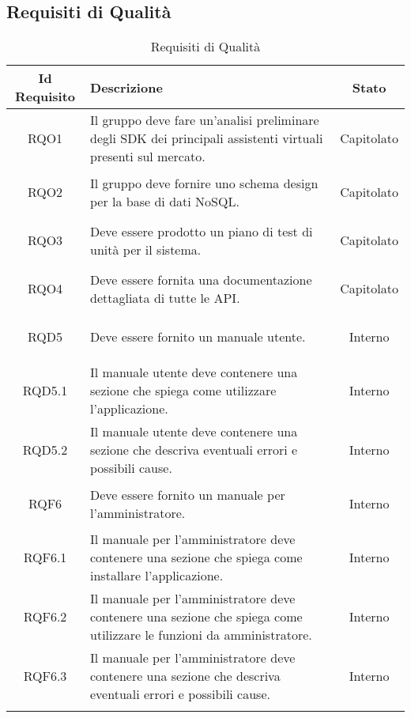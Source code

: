 \subsection{Requisiti di Qualità}
\normalsize
\begin{longtable}{|c|>{\centering}m{7cm}|c|}
\hline
\textbf{Id Requisito} & \textbf{Descrizione} & \textbf{Stato}\\
\hline
\endhead\hypertarget{RQO1}{RQO1} & Il gruppo deve fare un'analisi preliminare degli SDK dei principali assistenti virtuali presenti sul mercato. & Capitolato\\ \hline
\hypertarget{RQO2}{RQO2} & Il gruppo deve fornire uno schema design per la base di dati NoSQL.
 & Capitolato\\ \hline
\hypertarget{RQO3}{RQO3} & Deve essere prodotto un piano di test di unità per il sistema. & Capitolato\\ \hline
\hypertarget{RQO4}{RQO4} & Deve essere fornita una documentazione dettagliata di tutte le API. & Capitolato\\ \hline
\hypertarget{RQD5}{RQD5} & Deve essere fornito un manuale utente. & Interno\\ \hline
\hypertarget{RQD5.1}{RQD5.1} & Il manuale utente deve contenere una sezione che spiega come utilizzare l'applicazione. & Interno\\ \hline
\hypertarget{RQD5.2}{RQD5.2} & Il manuale utente deve contenere una sezione che descriva eventuali errori e possibili cause. & Interno\\ \hline
\hypertarget{RQF6}{RQF6} & Deve essere fornito un manuale per l'amministratore. & Interno\\ \hline
\hypertarget{RQF6.1}{RQF6.1} & Il manuale per l'amministratore deve contenere una sezione che spiega come installare l'applicazione. & Interno\\ \hline
\hypertarget{RQF6.2}{RQF6.2} & Il manuale per l'amministratore deve contenere una sezione che spiega come utilizzare le funzioni da amministratore. & Interno\\ \hline
\hypertarget{RQF6.3}{RQF6.3} & Il manuale per l'amministratore deve contenere una sezione che descriva eventuali errori e possibili cause. & Interno\\ \hline

\caption[Requisiti di Qualità]{Requisiti di Qualità}
\label{tabella:req2}
\end{longtable}
\clearpage
